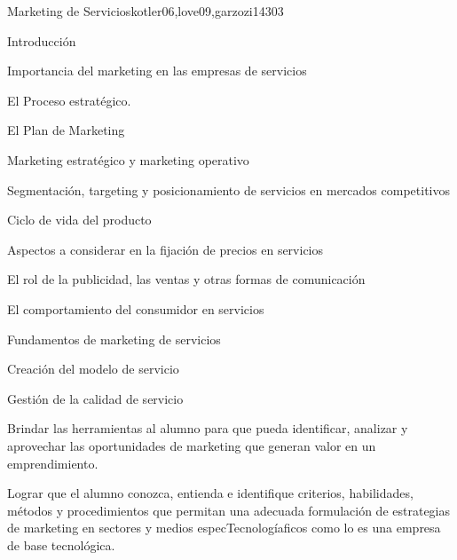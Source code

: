 \begin{syllabus}
\begin{unit}{Marketing de Servicios}{kotler06,love09,garzozi14}{30}{3}
\begin{topics}
      \item Introducción
      \item Importancia del marketing en las empresas de servicios
      \item El Proceso estratégico.
      \item El Plan de Marketing
      \item Marketing estratégico y marketing operativo
      \item Segmentación, targeting y posicionamiento de servicios en mercados competitivos
      \item Ciclo de vida del producto
       \item Aspectos a considerar en la fijación de precios en servicios
       \item El rol de la publicidad, las ventas y otras formas de comunicación
      \item El comportamiento del consumidor en servicios
      \item Fundamentos de marketing de servicios
      \item Creación del modelo de servicio
      \item Gestión de la calidad de servicio
   \end{topics}
   \begin{unitgoals}
      \item Brindar las herramientas al alumno para que pueda identificar, analizar y aprovechar las oportunidades de marketing que generan valor en un emprendimiento.
      \item Lograr que el alumno conozca, entienda e identifique criterios, habilidades, métodos y procedimientos que permitan una adecuada formulación de estrategias de marketing en sectores y medios especTecnologíaficos como lo es una empresa de base tecnológica.
   \end{unitgoals}
\end{unit}


\end{syllabus}
